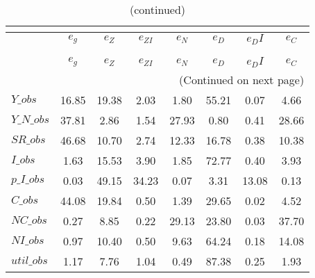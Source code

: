  
\begin{center}
\begin{longtable}{lccccccc} 
\caption{VARIANCE DECOMPOSITION (in percent)}\\
 \label{Table:th_var_decomp_uncond}\\
\toprule 
$           $	 & 	 $       {e_g}$	 & 	 $       {e_Z}$	 & 	 $    {e_{ZI}}$	 & 	 $       {e_N}$	 & 	 $       {e_D}$	 & 	 $      {e_DI}$	 & 	 $       {e_C}$\\
\midrule \endfirsthead 
\caption{(continued)}\\
 \toprule \\ 
$           $	 & 	 $       {e_g}$	 & 	 $       {e_Z}$	 & 	 $    {e_{ZI}}$	 & 	 $       {e_N}$	 & 	 $       {e_D}$	 & 	 $      {e_DI}$	 & 	 $       {e_C}$\\
\midrule \endhead 
\midrule \multicolumn{8}{r}{(Continued on next page)} \\ \bottomrule \endfoot 
\bottomrule \endlastfoot 
$Y\_obs     $	 & 	       16.85	 & 	       19.38	 & 	        2.03	 & 	        1.80	 & 	       55.21	 & 	        0.07	 & 	        4.66 \\ 
$Y\_N\_obs  $	 & 	       37.81	 & 	        2.86	 & 	        1.54	 & 	       27.93	 & 	        0.80	 & 	        0.41	 & 	       28.66 \\ 
$SR\_obs    $	 & 	       46.68	 & 	       10.70	 & 	        2.74	 & 	       12.33	 & 	       16.78	 & 	        0.38	 & 	       10.38 \\ 
$I\_obs     $	 & 	        1.63	 & 	       15.53	 & 	        3.90	 & 	        1.85	 & 	       72.77	 & 	        0.40	 & 	        3.93 \\ 
$p\_I\_obs  $	 & 	        0.03	 & 	       49.15	 & 	       34.23	 & 	        0.07	 & 	        3.31	 & 	       13.08	 & 	        0.13 \\ 
$C\_obs     $	 & 	       44.08	 & 	       19.84	 & 	        0.50	 & 	        1.39	 & 	       29.65	 & 	        0.02	 & 	        4.52 \\ 
$NC\_obs    $	 & 	        0.27	 & 	        8.85	 & 	        0.22	 & 	       29.13	 & 	       23.80	 & 	        0.03	 & 	       37.70 \\ 
$NI\_obs    $	 & 	        0.97	 & 	       10.40	 & 	        0.50	 & 	        9.63	 & 	       64.24	 & 	        0.18	 & 	       14.08 \\ 
$util\_obs  $	 & 	        1.17	 & 	        7.76	 & 	        1.04	 & 	        0.49	 & 	       87.38	 & 	        0.25	 & 	        1.93 \\ 

\end{longtable}
\end{center}
